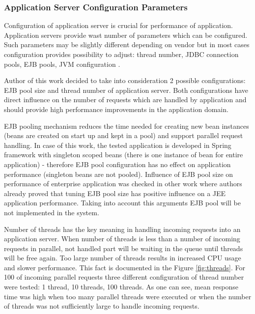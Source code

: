 \documentclass[12pt,a4paper]{article}
\begin{document}
\subsubsection{Application Server Configuration Parameters}

Configuration of application server is crucial for performance of application. Application servers provide wast number of parameters which can be configured. Such parameters may be slightly different depending on vendor but in most cases configuration provides possibility to adjust: thread number, JDBC connection pools, EJB pools, JVM configuration \cite{glassfishdoc}. 

Author of this work decided to take into consideration 2 possible configurations: EJB pool size and thread number of application server. Both configurations have direct influence on the number of requests which are handled by application and should provide high performance improvements in the application domain. 

EJB pooling mechanism reduces the time needed for creating new bean instances (beans are created on start up and kept in a pool) and support parallel request handling. In case of this work, the tested application is developed in Spring framework with singleton scoped beans (there is one instance of bean for entire application) - therefore EJB pool configuration has no effect on application performance (singleton beans are not pooled). Influence of EJB pool size on performance of enterprise application was checked in other work \cite{autotuning} where authors already proved that tuning EJB pool size has positive influence on a JEE application performance. Taking into account this arguments EJB pool will be not implemented in the system. 

Number of threads has the key meaning in handling incoming requests into an application server. When number of threads is less than a number of incoming requests in parallel, not handled part will be waiting in the queue until threads will be free again. Too large number of threads results in increased CPU usage and slower performance. This fact is documented in the Figure \ref{fig:threads}. For 100 of incoming parallel requests three different configuration of thread number were tested: 1 thread, 10 threads, 100 threads. As one can see, mean response time was high when too many parallel threads were executed or when the number of threads was not sufficiently large to handle incoming requests.    
\end{document}
